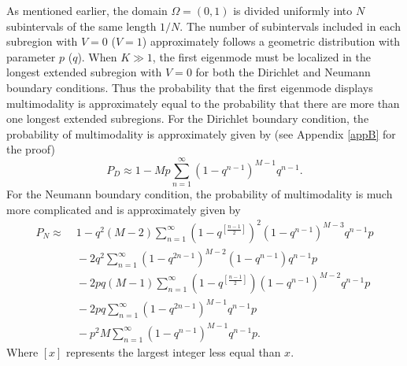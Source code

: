 \documentclass[a4paper,11pt]{article}
\begin{document}
As mentioned earlier, the domain $\Omega = (0, 1)$ is divided uniformly into $N$ subintervals of the same length $1/N$. The number of subintervals included in each subregion with $V = 0$ ($V = 1$) approximately follows a geometric distribution with parameter $p$ ($q$). When $K\gg 1$, the first eigenmode must be localized in the longest extended subregion with $V = 0$ for both the Dirichlet and Neumann boundary conditions. Thus the probability that the first eigenmode displays multimodality is approximately equal to the probability that there are more than one longest extended subregions. For the Dirichlet boundary condition, the probability of multimodality is approximately given by (see Appendix \ref{appB} for the proof)
\begin{equation}\label{multiD}
P_D \approx 1 - M p \sum_{n=1}^{\infty} (1 - q^{n-1})^{M-1} q^{n-1}.
\end{equation}
For the Neumann boundary condition, the probability of multimodality is much more complicated and is approximately given by
\begin{equation}\label{multiN}
\begin{split}
P_N \approx&\; 1 - q^2 (M-2) \sum_{n=1}^{\infty} (1 - q^{[\frac{n-1}{2}]})^2 (1 - q^{n-1})^{M-3} q^{n-1} p \\
&\;- 2 q^2 \sum_{n=1}^{\infty} (1 - q^{2n-1})^{M-2} (1 - q^{n-1}) q^{n-1} p \\
&\;- 2 p q (M-1) \sum_{n=1}^{\infty} (1 - q^{[\frac{n-1}{2}]}) (1 - q^{n-1})^{M-2} q^{n-1} p \\
&\;- 2 p q \sum_{n=1}^{\infty} (1 - q^{2n-1})^{M-1} q^{n-1} p \\
&\;- p^2 M \sum_{n=1}^{\infty} (1 - q^{n-1})^{M-1} q^{n-1} p.
\end{split}
\end{equation}
Where $[x]$ represents the largest integer less equal than $x$.

\end{document}
